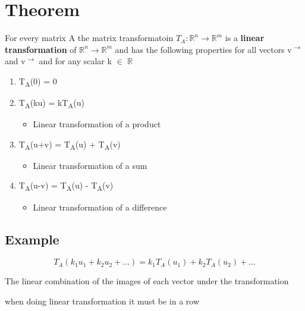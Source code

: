 \documentclass[11pt]{article}
\begin{document}
\section{Theorem}
\label{sec:org42aa831}
For every matrix A the matrix transformatoin \(T_{A}: \mathbb{R}^{n} \rightarrow{} \mathbb{R}^{m}\) is a \textbf{linear transformation} of \(\mathbb{R}^{n} \rightarrow{} \mathbb{R}^{m}\) and has the following properties for all vectors v\textsuperscript{\(\rightarrow\)} and v\textsuperscript{\(\rightarrow\)} and for any scalar k \(\in\) \(\mathbb{R}\)
\begin{enumerate}
\item T\textsubscript{A}(0) = 0
\item T\textsubscript{A}(ku) = kT\textsubscript{A}(u)
\begin{itemize}
\item Linear transformation of a product
\end{itemize}
\item T\textsubscript{A}(u+v) = T\textsubscript{A}(u) + T\textsubscript{A}(v)
\begin{itemize}
\item Linear transformation of a sum
\end{itemize}
\item T\textsubscript{A}(u-v) = T\textsubscript{A}(u) - T\textsubscript{A}(v)
\begin{itemize}
\item Linear transformation of a difference
\end{itemize}
\end{enumerate}
\subsection{Example}
\label{sec:org278edaf}
\[
T_{A}(k_{1}u_{1}+k_{2}u_{2} + ...) = k_{1}T_{A}(u_{1}) + k_{2}T_{A}(u_{2}) + ...
\]

The linear combination of the images of each vector under the transformation

when doing linear transformation it must be in a row
\end{document}
